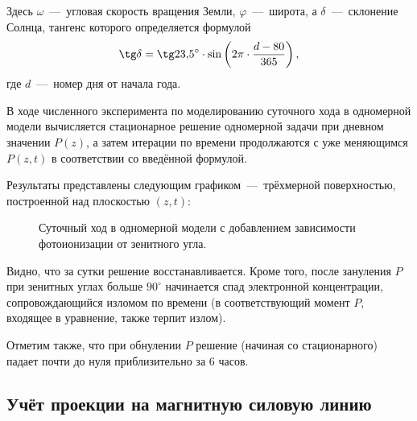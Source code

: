 \documentclass[14pt, a4paper, fleqn, twoside]{extreport}
\begin{document}
Здесь $\omega$~---~угловая скорость вращения Земли, $\varphi$~---~широта, а $\delta$~---~склонение Солнца, тангенс которого определяется формулой $$\tg\delta = \tg 23{,}5^\circ \cdot \sin\left(2\pi\cdot\dfrac{d-80}{365}\right),$$ где $d$~---~номер дня от начала года. 

В ходе численного эксперимента по моделированию суточного хода в одномерной модели вычисляется стационарное решение одномерной задачи при дневном значении $P(z)$, а затем итерации по времени продолжаются с уже меняющимся $P(z, t)$ в соответствии со введённой формулой.

Результаты представлены следующим графиком~---~трёхмерной поверхностью, построенной над плоскостью $(z, t)$:

\begin{figure}[H]
\caption{Суточный ход в одномерной модели с добавлением зависимости фотоионизации от зенитного угла.}
\end{figure}

Видно, что за сутки решение восстанавливается. Кроме того, после зануления $P$ при зенитных углах больше $90^\circ$ начинается спад электронной концентрации, сопровождающийся изломом по времени (в соответствующий  момент $P$, входящее в уравнение, также терпит излом).

Отметим также, что при обнулении $P$ решение (начиная со стационарного) падает почти до нуля приблизительно за $6$ часов.

\bigskip

\newpage 

\subsection*{Учёт проекции на магнитную силовую линию}
\end{document}
